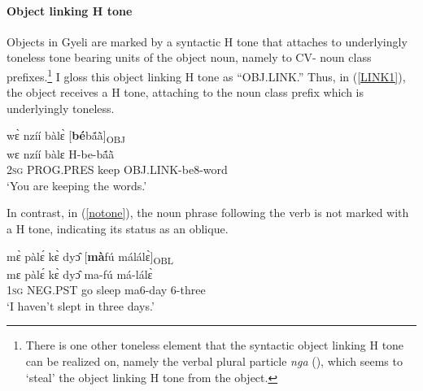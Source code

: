 


\paragraph{Object linking H tone}
Objects in Gyeli are marked by a syntactic H tone that attaches to underlyingly toneless tone bearing units of the object noun, namely to CV- noun class prefixes.\footnote{There is one other toneless element that the syntactic object linking H tone can be realized on, namely the verbal plural particle {\itshape nga} (), which seems to `steal' the object linking H tone from the object.} I gloss this object linking H tone as ``OBJ.LINK.''  Thus, in (\ref{LINK1}), the object receives a H tone, attaching to the noun class prefix which is underlyingly toneless.

\begin{exe} 
\ex\label{LINK1} 
  \glll   wɛ̀ nzíí bàlɛ̀ [{\bfseries bé}bã́ã̀]\textsubscript{OBJ} \\
      wɛ nzíí bàlɛ H-be-bã́ã̀ \\
            2\textsc{sg} PROG.PRES keep OBJ.LINK-be8-word \\
    \trans `You are keeping the words.'
\end{exe}


\noindent In contrast, in (\ref{notone}), the noun phrase following the verb is not marked with a H tone, indicating its status as an oblique.

\begin{exe}
\ex\label{notone}
  \glll mɛ̀ pàlɛ́ kɛ̀ dyɔ̂ [{\bfseries mà}fú málálɛ̀]\textsubscript{OBL} \\
       mɛ pàlɛ́ kɛ̀ dyɔ̂ ma-fú má-lálɛ̀  \\
         1\textsc{sg} NEG.PST go sleep ma6-day 6-three  \\
    \trans `I haven't slept in three days.'
\end{exe}

